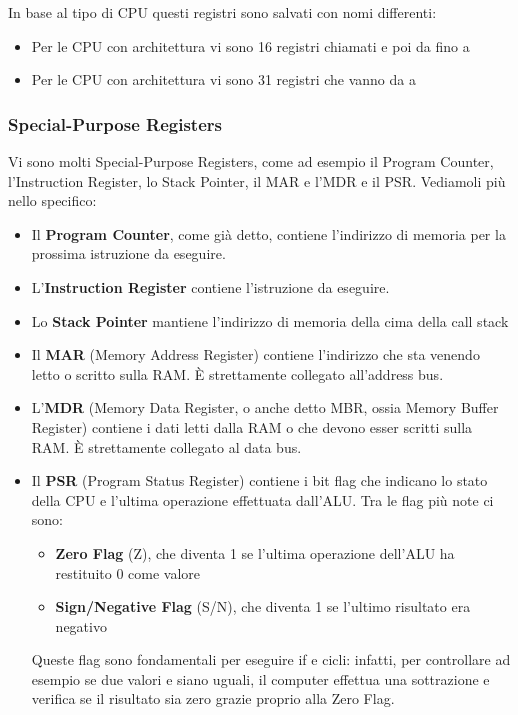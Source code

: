 \documentclass[11pt, a4paper, titlepage, oneside]{scrbook}
\begin{document}
In base al tipo di CPU questi registri sono salvati con nomi differenti:
\begin{itemize}
    \item Per le CPU con architettura  vi sono 16 registri chiamati  e poi da  fino a 
    \item Per le CPU con architettura   vi sono 31 registri che vanno da  a 
\end{itemize}

\subsubsection*{Special-Purpose Registers}

Vi sono molti Special-Purpose Registers, come ad esempio il Program Counter, l'Instruction Register, lo Stack Pointer, il MAR e l'MDR e il PSR. Vediamoli più nello specifico:
\begin{itemize}
    \item Il \textbf{Program Counter}, come già detto, contiene l'indirizzo di memoria per la prossima istruzione da eseguire.
    \item L'\textbf{Instruction Register} contiene l'istruzione da eseguire.
    \item Lo \textbf{Stack Pointer} mantiene l'indirizzo di memoria della cima della call stack
    \item Il \textbf{MAR} (Memory Address Register) contiene l'indirizzo che sta venendo letto o scritto sulla RAM. È strettamente collegato all'address bus.
    \item L'\textbf{MDR} (Memory Data Register, o anche detto MBR, ossia Memory Buffer Register) contiene i dati letti dalla RAM o che devono esser scritti sulla RAM. È strettamente collegato al data bus.
    \item Il \textbf{PSR} (Program Status Register) contiene i bit flag che indicano lo stato della CPU e l'ultima operazione effettuata dall'ALU. Tra le flag più note ci sono:
    \begin{itemize}
        \item \textbf{Zero Flag} (Z), che diventa 1 se l'ultima operazione dell'ALU ha restituito 0 come valore
        \item \textbf{Sign/Negative Flag} (S/N), che diventa 1 se l'ultimo risultato era negativo
    \end{itemize}
    Queste flag sono fondamentali per eseguire if e cicli: infatti, per controllare ad esempio se due valori  e  siano uguali, il computer effettua una sottrazione e verifica se il risultato sia zero grazie proprio alla Zero Flag.
\end{itemize} 
\end{document}
